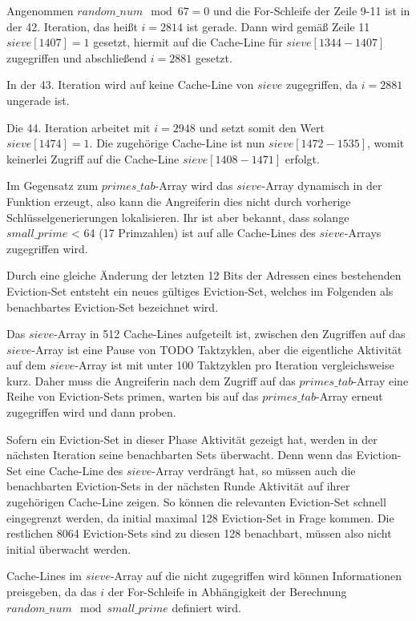 Angenommen $random\_num \mod 67 = 0$ und die For-Schleife der Zeile 9-11 ist in der 42. Iteration, das heißt $i=2814$ ist gerade.
Dann wird gemäß Zeile 11 $sieve[1407] = 1$ gesetzt, hiermit auf die Cache-Line für $sieve[1344-1407]$ zugegriffen und abschließend $i=2881$ gesetzt.

In der 43. Iteration wird auf keine Cache-Line von $sieve$ zugegriffen, da $i=2881$ ungerade ist.

Die 44. Iteration arbeitet mit $i=2948$ und setzt somit den Wert $sieve[1474] = 1$.
Die zugehörige Cache-Line ist nun $sieve[1472-1535]$, womit keinerlei Zugriff auf die Cache-Line $sieve[1408-1471]$ erfolgt.

Im Gegensatz zum $primes\_tab$-Array wird das $sieve$-Array dynamisch in der Funktion erzeugt, also kann die Angreiferin dies nicht durch vorherige Schlüsselgenerierungen lokalisieren.
Ihr ist aber bekannt, dass solange $small\_prime$ < 64 (17 Primzahlen) ist auf alle Cache-Lines des $sieve$-Arrays zugegriffen wird.

Durch eine gleiche Änderung  der letzten 12 Bits der Adressen eines bestehenden Eviction-Set entsteht ein neues gültiges Eviction-Set, welches im Folgenden als benachbartes Eviction-Set bezeichnet wird.

Das $sieve$-Array in 512 Cache-Lines aufgeteilt ist, zwischen den Zugriffen auf das $sieve$-Array ist eine Pause von TODO Taktzyklen, aber die eigentliche Aktivität auf dem $sieve$-Array ist mit unter 100 Taktzyklen pro Iteration vergleichsweise kurz.
Daher muss die Angreiferin nach dem Zugriff auf das $primes\_tab$-Array eine Reihe von Eviction-Sets primen, warten bis auf das $primes\_tab$-Array erneut zugegriffen wird und dann proben.

Sofern ein Eviction-Set in dieser Phase Aktivität gezeigt hat, werden in der nächsten Iteration seine benachbarten Sets überwacht.
Denn wenn das Eviction-Set eine Cache-Line des $sieve$-Array verdrängt hat, so müssen auch die benachbarten Eviction-Sets in der nächsten Runde Aktivität auf ihrer zugehörigen Cache-Line zeigen.
So können die relevanten Eviction-Set schnell eingegrenzt werden, da initial maximal 128 Eviction-Set in Frage kommen.
Die restlichen 8064 Eviction-Sets sind zu diesen 128 benachbart, müssen also nicht initial überwacht werden.

Cache-Lines im $sieve$-Array auf die nicht zugegriffen wird können Informationen preisgeben, da das $i$ der For-Schleife in Abhängigkeit der Berechnung $random\_num \mod small\_prime$ definiert wird.

